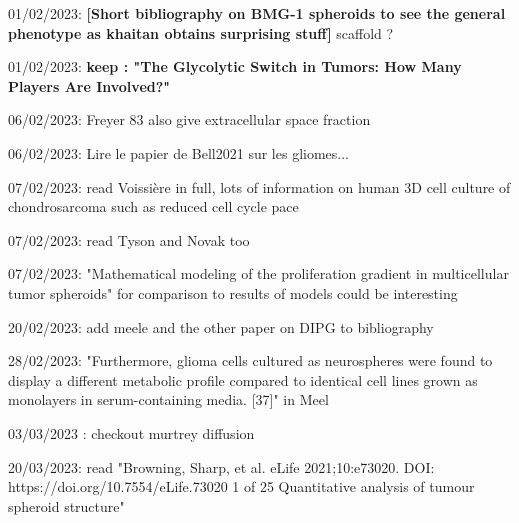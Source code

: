 \documentclass[11pt,a4paper]{article}
\begin{document}
01/02/2023: \textbf{[Short bibliography on  BMG-1 spheroids to see the general phenotype  as khaitan obtains surprising stuff]} scaffold ?

01/02/2023: \textbf{keep : "The Glycolytic Switch in Tumors: How Many Players Are Involved?"}

06/02/2023: Freyer 83 also give extracellular space fraction

06/02/2023: Lire le papier de Bell2021 sur les gliomes...

07/02/2023: read Voissière in full, lots of information on human 3D cell culture of chondrosarcoma such as reduced cell cycle pace

07/02/2023: read Tyson and Novak too

07/02/2023: "Mathematical modeling of the proliferation gradient in multicellular tumor spheroids" for comparison to results of models could be interesting

20/02/2023:  add meele and the other paper on DIPG to bibliography

28/02/2023: "Furthermore, glioma cells cultured as neurospheres were found to display a different metabolic profile compared to identical cell lines grown as monolayers in serum-containing
media. [37]" in Meel

03/03/2023 : checkout murtrey diffusion 

20/03/2023: read "Browning, Sharp, et al. eLife 2021;10:e73020. DOI: https://doi.org/10.7554/eLife.73020 1 of 25
Quantitative analysis of tumour
spheroid structure"


\newpage


\end{document}
